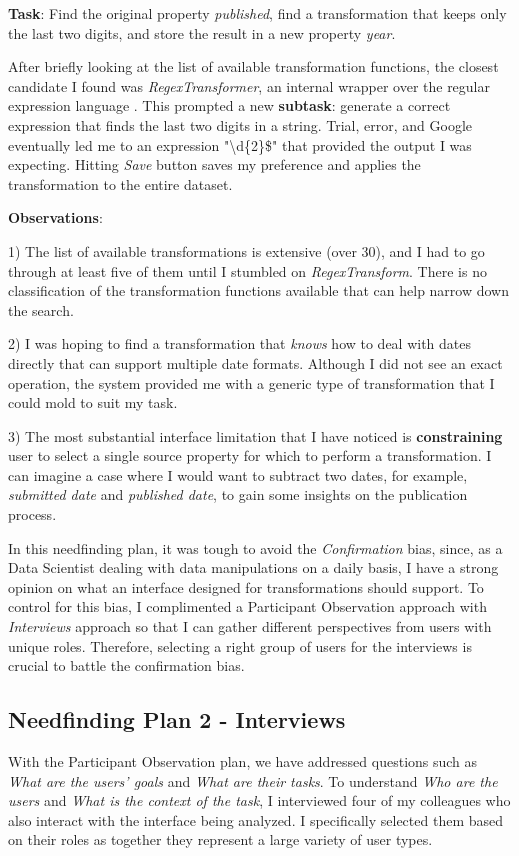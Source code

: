 \documentclass[12pt,letterpaper]{article}
\begin{document}
\textbf{Task}: Find the original property \textit{published}, find a transformation that keeps only the last two digits, and store the result in a new property \textit{year}.

After briefly looking at the list of available transformation functions, the closest candidate I found was \textit{RegexTransformer}, an internal wrapper over the regular expression language \cite{wiki:regex}. This prompted a new \textbf{subtask}: generate a correct expression that finds the last two digits in a string. Trial, error, and Google eventually led me to an expression "{\textbackslash{d}\{2\}\$}" that provided the output I was expecting. Hitting \textit{Save} button saves my preference and applies the transformation to the entire dataset.

\textbf{Observations}:

1) The list of available transformations is extensive (over 30), and I had to go through at least five of them until I stumbled on \textit{RegexTransform}. There is no classification of the transformation functions available that can help narrow down the search.

2) I was hoping to find a transformation that \textit{knows} how to deal with dates directly that can support multiple date formats. Although I did not see an exact operation, the system provided me with a generic type of transformation that I could mold to suit my task.

3) The most substantial interface limitation that I have noticed is \textbf{constraining} user to select a single source property for which to perform a transformation. I can imagine a case where I would want to subtract two dates, for example, \textit{submitted date} and \textit{published date}, to gain some insights on the publication process.

\bigskip
In this needfinding plan, it was tough to avoid the \textit{Confirmation} bias, since, as a Data Scientist dealing with data manipulations on a daily basis, I have a strong opinion on what an interface designed for transformations should support. To control for this bias, I complimented a Participant Observation approach with \textit{Interviews} approach so that I can gather different perspectives from users with unique roles. Therefore, selecting a right group of users for the interviews is crucial to battle the confirmation bias. 

\subsection*{Needfinding Plan 2 - Interviews}
With the Participant Observation plan, we have addressed questions such as \textit{What are the users' goals} and \textit{What are their tasks}. To understand \textit{Who are the users} and \textit{What is the context of the task}, I interviewed four of my colleagues who also interact with the interface being analyzed. I specifically selected them based on their roles as together they represent a large variety of user types. 
\end{document}
